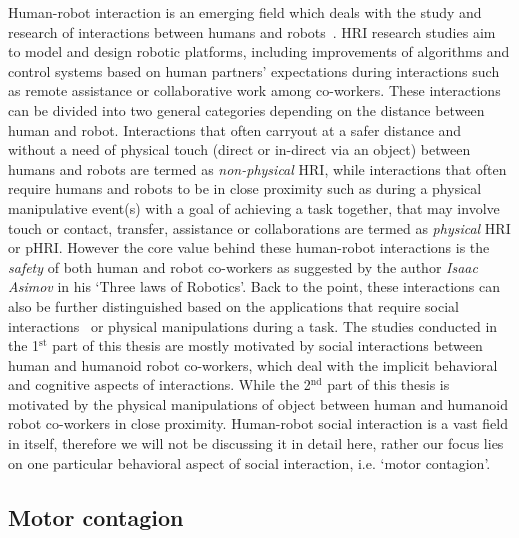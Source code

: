 Human-robot interaction is an emerging field which deals with the study and research of interactions between humans and robots~\cite{goodrich2008human}. HRI research studies aim to model and design robotic platforms, including improvements of algorithms and control systems based on human partners' expectations during interactions such as remote assistance or collaborative work among co-workers. These interactions can be divided into two general categories depending on the distance between human and robot. Interactions that often carryout at a safer distance and without a need of physical touch (direct or in-direct via an object) between humans and robots are termed as \textit{non-physical} HRI, while interactions that often require humans and robots to be in close proximity such as during a physical manipulative event(s) with a goal of achieving a task together, that may involve touch or contact, transfer, assistance or collaborations are termed as \textit{physical} HRI or pHRI. However the core value behind these human-robot interactions is the \textit{safety} of both human and robot co-workers as suggested by the author \textit{Isaac Asimov} in his `Three laws of Robotics'. Back to the point, these interactions can also be further distinguished based on the applications that require social interactions~\cite{tzafestas2016human, Chaminade:JPP:2009} or physical manipulations during a task. The studies conducted in the 1$^\text{st}$ part of this thesis are mostly motivated by social interactions between human and humanoid robot co-workers, which deal with the implicit behavioral and cognitive aspects of interactions. While the 2$^\text{nd}$ part of this thesis is motivated by the physical manipulations of object between human and humanoid robot co-workers in close proximity. Human-robot social interaction is a vast field in itself, therefore we will not be discussing it in detail here, rather our focus lies on one particular behavioral aspect of social interaction, i.e. `motor contagion'.


\subsection{Motor contagion}\label{motor contagions}

